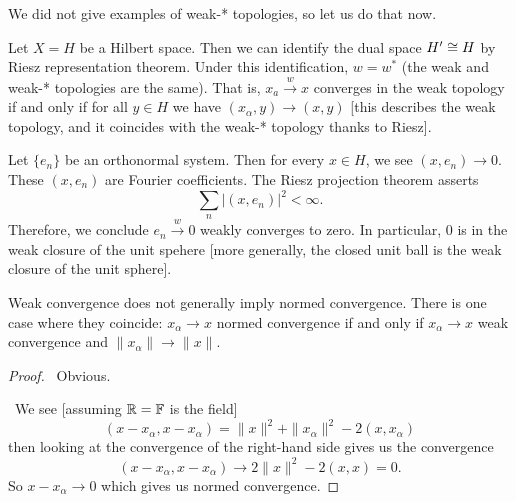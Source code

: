 

We did not give examples of weak-* topologies, so let us do that now.

\begin{example}
Let $X=H$ be a Hilbert space.
Then we can identify the dual space $H'\cong H$ by Riesz representation theorem.
Under this identification, $w=w^{*}$ (the weak and weak-* topologies
are the same). That is, $x_{a}\xrightarrow{w}x$ converges in the weak
topology if and only if for all $y\in H$ we have
$(x_{\alpha},y)\to(x,y)$ [this describes the weak topology, and it
  coincides with the weak-* topology thanks to Riesz].

Let $\{e_{n}\}$ be an orthonormal system. Then for every $x\in H$, we
see $(x,e_{n})\to0$. These $(x,e_{n})$ are Fourier coefficients. The
Riesz projection theorem asserts
\begin{equation}
\sum_{n}|(x,e_{n})|^{2}<\infty.
\end{equation}
Therefore, we conclude $e_{n}\xrightarrow{w}0$ weakly converges to
zero. In particular, 0 is in the weak closure of the unit spehere
[more generally, the closed unit ball is the weak closure of the unit sphere].
\end{example}

\begin{example}
Weak convergence does not generally imply normed convergence. There is
one case where they coincide: $x_{\alpha}\to x$ normed convergence if
and only if $x_{\alpha}\to x$ weak convergence and $\|x_{\alpha}\|\to\|x\|$.
\end{example}

\begin{proof}
\forwardproof\ Obvious.

\backwardproof\ We see [assuming $\mathbb{R}=\mathbb{F}$ is the field]
\begin{equation}
(x-x_{\alpha},x-x_{\alpha})=\|x\|^{2}+\|x_{\alpha}\|^{2}-2(x,x_{\alpha})
\end{equation}
then looking at the convergence of the right-hand side gives us the
convergence
\begin{equation}
(x-x_{\alpha},x-x_{\alpha})\to2\|x\|^{2}-2(x,x)=0.
\end{equation}
So $x-x_{\alpha}\to0$ which gives us normed convergence.
\end{proof}

